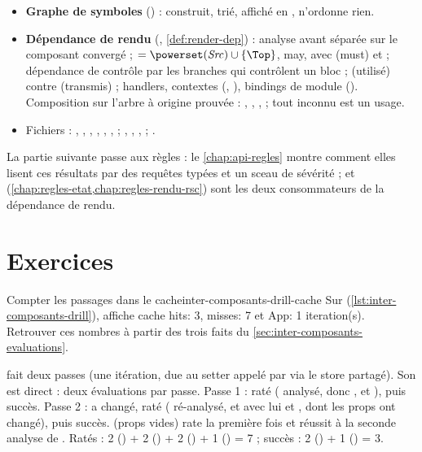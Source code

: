 \begin{resume}
\begin{itemize}
        inconnue ().
  \item \textbf{Graphe de symboles} () : construit, trié, affiché en ,
        n'ordonne rien.
  \item \textbf{Dépendance de rendu} (, \cref{def:render-dep}) : analyse avant séparée
        sur le composant convergé ;  $= \powerset(\mathit{Src}) \cup \{\Top\}$, may,
        avec  (must) et  ; dépendance de contrôle par les branches qui
        contrôlent un bloc ;  (utilisé) contre  (transmis) ; handlers,
        contextes (, ), bindings de module
        (). Composition sur l'arbre à origine prouvée : ,
        , ,  ; tout inconnu est un usage.
  \item Fichiers : , ,
        , , ,
        ,  ; ,
        , ,  ;
        .
\end{itemize}
La partie suivante passe aux règles : le \cref{chap:api-regles} montre comment elles lisent ces
résultats par des requêtes typées et un sceau de sévérité ;  et
 (\cref{chap:regles-etat,chap:regles-rendu-rsc}) sont les deux
consommateurs de la dépendance de rendu.
\end{resume}

\section*{Exercices}
\label{sec:inter-composants-exercices}

\begin{exercice}{Compter les passages dans le cache}{inter-composants-drill-cache}
Sur  (\cref{lst:inter-composants-drill}),  affiche
\og cache hits: 3, misses: 7\fg{} et \og App: 1 iteration(s)\fg. Retrouver ces nombres à partir
des trois faits du \cref{sec:inter-composants-evaluations}.
\end{exercice}
\begin{solution}
 fait deux passes (une itération, due au setter appelé par  via le store
partagé). Son  est direct : deux évaluations par passe. Passe 1 : raté
( analysé, donc ,  et ), puis succès. Passe 2 :
 a changé, raté ( ré-analysé, et avec lui  et
, dont les props ont changé), puis succès.  (props vides) rate la
première fois et réussit à la seconde analyse de . Ratés : 2 () + 2
() + 2 () + 1 () = 7 ; succès : 2 () + 1
() = 3.
\end{solution}

